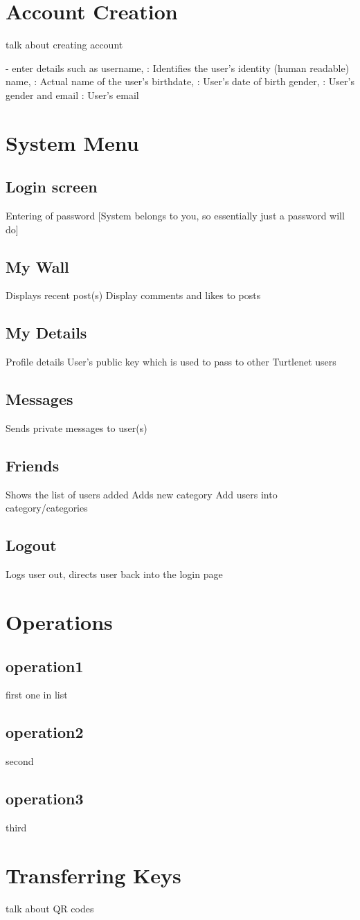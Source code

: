 \section{Account Creation}
talk about creating account

- enter details such as 
username, : Identifies the user's identity (human readable)
name, : Actual name of the user's
birthdate, : User's date of birth
gender, : User's gender
and email : User's email

\section{System Menu}

\subsection{Login screen}
Entering of password [System belongs to you, so essentially just a password will do]

\subsection{My Wall}
Displays recent post(s)
Display comments and likes to posts

\subsection{My Details}
Profile details
User's public key which is used to pass to other Turtlenet users

\subsection{Messages}
Sends private messages to user(s)

\subsection{Friends}
Shows the list of users added
Adds new category
Add users into category/categories

\subsection{Logout}
Logs user out, directs user back into the login page

\section{Operations}
\subsection{operation1}
first one in list
\subsection{operation2}
second
\subsection{operation3}
third
\section{Transferring Keys}
talk about QR codes